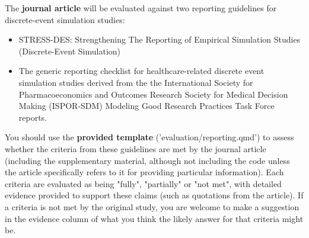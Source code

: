 The \textbf{journal article} will be evaluated against two reporting guidelines for discrete-event simulation studies:
\begin{itemize}
    \item STRESS-DES: Strengthening The Reporting of Empirical Simulation Studies (Discrete-Event Simulation)\autocite{monks_strengthening_2019}
    \item The generic reporting checklist for healthcare-related discrete event simulation studies derived from the the International Society for Pharmacoeconomics and Outcomes Research Society for Medical Decision Making (ISPOR-SDM) Modeling Good Research Practices Task Force reports.\autocite{zhang_reporting_2020}
\end{itemize}

You should use the \textbf{provided template} ('evaluation/reporting.qmd') to assess whether the criteria from these guidelines are met by the journal article (including the supplementary material, although not including the code unless the article specifically refers to it for providing particular information). Each criteria are evaluated as being "fully", "partially" or "not met", with detailed evidence provided to support these claims (such as quotations from the article). If a criteria is not met by the original study, you are welcome to make a suggestion in the evidence column of what you think the likely answer for that criteria might be.